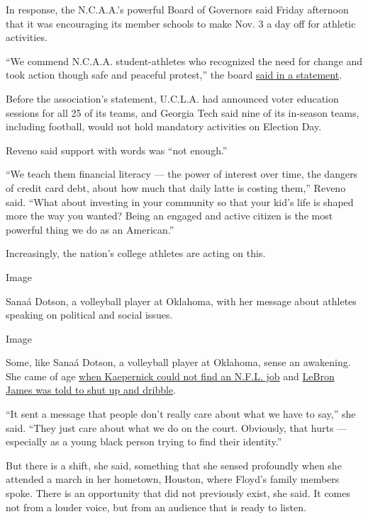 In response, the N.C.A.A.'s powerful Board of Governors said Friday
afternoon that it was encouraging its member schools to make Nov. 3 a
day off for athletic activities.

``We commend N.C.A.A. student-athletes who recognized the need for
change and took action though safe and peaceful protest,'' the board
\href{https://www.ncaa.org/about/resources/media-center/ncaa-board-governors-statement-social-activism}{said
in a statement}.

Before the association's statement, U.C.L.A. had announced voter
education sessions for all 25 of its teams, and Georgia Tech said nine
of its in-season teams, including football, would not hold mandatory
activities on Election Day.

Reveno said support with words was ``not enough.''

``We teach them financial literacy --- the power of interest over time,
the dangers of credit card debt, about how much that daily latte is
costing them,'' Reveno said. ``What about investing in your community so
that your kid's life is shaped more the way you wanted? Being an engaged
and active citizen is the most powerful thing we do as an American.''

Increasingly, the nation's college athletes are acting on this.

Image

Sanaá Dotson, a volleyball player at Oklahoma, with her message about
athletes speaking on political and social issues.

Image

Some, like Sanaá Dotson, a volleyball player at Oklahoma, sense an
awakening. She came of age
\href{https://www.nytimes.com/2020/06/05/sports/football/george-floyd-kaepernick-kneeling-nfl-protests.html}{when
Kaepernick could not find an N.F.L. job} and
\href{https://www.nytimes.com/2018/02/16/sports/basketball/lebron-laura-ingraham.html}{LeBron
James was told to shut up and dribble}.

``It sent a message that people don't really care about what we have to
say,'' she said. ``They just care about what we do on the court.
Obviously, that hurts --- especially as a young black person trying to
find their identity.''

But there is a shift, she said, something that she sensed profoundly
when she attended a march in her hometown, Houston, where Floyd's family
members spoke. There is an opportunity that did not previously exist,
she said. It comes not from a louder voice, but from an audience that is
ready to listen.

